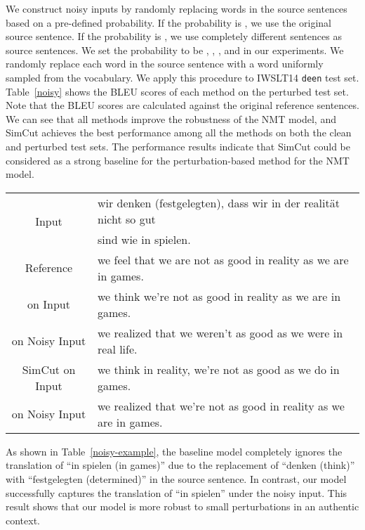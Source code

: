 \documentclass[11pt]{article}
\begin{document}
We construct noisy inputs by randomly replacing words in the source sentences based on a pre-defined probability. If the probability is , we use the original source sentence. If the probability is , we use completely different sentences as source sentences. We set the probability to be , , , and  in our experiments. We randomly replace each word in the source sentence with a word uniformly sampled from the vocabulary. We apply this procedure to IWSLT14 \texttt{de}\texttt{en} test set. Table~\ref{noisy} shows the BLEU scores of each method on the perturbed test set. Note that the BLEU scores are calculated against the original reference sentences. We can see that all methods improve the robustness of the NMT model, and SimCut achieves the best performance among all the methods on both the clean and perturbed test sets.  The performance results indicate that SimCut could be considered as a strong baseline for the perturbation-based method for the NMT model.

\begin{table*}
\centering
\begin{tabular}{c|l}
\hline
\multirow{2}{*}{Input} & wir denken ({\color{red}festgelegten}), dass wir in der realität nicht so gut \\
 & sind wie in spielen. \\
\hline
Reference & we feel that we are not as good in reality as we are in games. \\
\hline
\hline
\citet{vaswani2017attention} on Input & we think we're not as good in reality as we are in games. \\
\hline
on Noisy Input & we realized that we weren't as good as we were in real life. \\
\hline
\hline
SimCut on Input & we think in reality, we're not as good as we do in games. \\
\hline
on Noisy Input & we realized that we're not as good in reality as we are in games.\\
\hline
\end{tabular}
\caption{\label{noisy-example}
SimCut is more robust to small perturbations in an authentic context. SimCut captures the translation of ``in spielen'' under the noisy input while the vanilla Transformer ignores the translation of ``in spielen'' due to the replacement of ``denken'' with ``festgelegten''.
}
\end{table*}

As shown in Table~\ref{noisy-example}, the baseline model completely ignores the translation of ``in spielen (in games)'' due to the replacement of ``denken (think)'' with ``festgelegten (determined)'' in the source sentence. In contrast, our model successfully captures the translation of ``in spielen'' under the noisy input. This result shows that our model is more robust to small perturbations in an authentic context.
\end{document}

